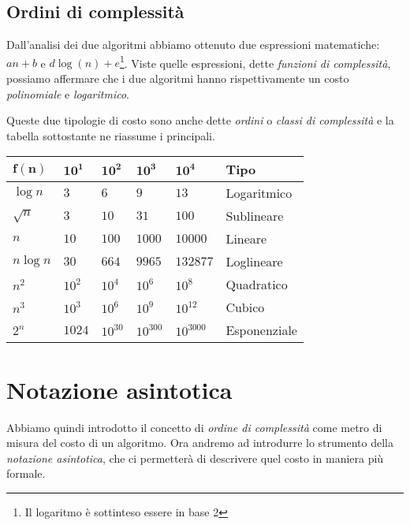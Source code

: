 \subsection{Ordini di complessità}
Dall'analisi dei due algoritmi abbiamo ottenuto due espressioni matematiche:
$an+b$ e $d\log(n)+e$\footnote{Il logaritmo è sottinteso essere in base 2}.
Viste quelle espressioni, dette \emph{funzioni di complessità}, possiamo affermare
che i due algoritmi hanno rispettivamente un costo \emph{polinomiale} e
\emph{logaritmico}.

Queste due tipologie di costo sono anche dette \emph{ordini} o \emph{classi di
complessità} e la tabella sottostante ne riassume i principali.
\begin{table}[h]
    \centering
    \renewcommand{\arraystretch}{1.2}
    \begin{tabular}{|l|l|l|l|l|l|}
    \hline
    $\mathbf{f(n)}$ & $\mathbf{10^1}$ & $\mathbf{10^2}$ & $\mathbf{10^3}$ & $\mathbf{10^4}$ & \textbf{Tipo} \\ \hline
    $\log n$        & $3$             & $6$             & $9$             & $13$            & Logaritmico   \\ \hline
    $\sqrt{n}$      & $3$             & $10$            & $31$            & $100$           & Sublineare    \\ \hline
    $n$             & $10$            & $100$           & $1000$          & $10000$         & Lineare       \\ \hline
    $n\log n$       & $30$            & $664$           & $9965$          & $132877$        & Loglineare    \\ \hline
    $n^2$           & $10^2$          & $10^4$          & $10^6$          & $10^8$          & Quadratico    \\ \hline
    $n^3$           & $10^3$          & $10^6$          & $10^9$          & $10^{12}$       & Cubico        \\ \hline
    $2^n$           & $1024$          & $10^{30}$       & $10^{300}$      & $10^{3000}$     & Esponenziale  \\ \hline
    \end{tabular}
\end{table}

\section{Notazione asintotica}
Abbiamo quindi introdotto il concetto di \emph{ordine di complessità} come metro
di misura del costo di un algoritmo. Ora andremo ad introdurre lo strumento della
\emph{notazione asintotica}, che ci permetterà di descrivere quel costo in
maniera più formale.

